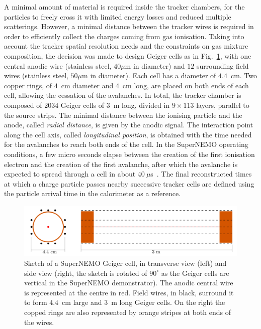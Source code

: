 A minimal amount of material is required inside the tracker chambers, for the particles to freely cross it with limited energy losses and reduced multiple scatterings.
However, a minimal distance between the tracker wires is required in order to efficiently collect the charges coming from gas ionisation.
Taking into account the tracker spatial resolution needs and the constraints on gas mixture composition, the decision was made to design Geiger cells as in Fig.~\ref{fig:SN_geiger_cell}, with one central anodic wire (stainless steel, $40\mu$m in diameter) and $12$ surrounding field wires (stainless steel, $50\mu$m in diameter).
Each cell has a diameter of $4.4$~cm.
Two copper rings, of $4$~cm diameter and $4$~cm long, are placed on both ends of each cell, allowing the cessation of the avalanches.
In total, the tracker chamber is composed of $2034$ Geiger cells of $3$~m long, divided in $9\times113$ layers, parallel to the source strips.
The minimal distance between the ionising particle and the anode, called \emph{radial distance}, is given by the anodic signal.
The interaction point along the cell axis, called \emph{longitudinal position}, is obtained with the time needed for the avalanches to reach both ends of the cell.
In the SuperNEMO operating conditions, a few micro seconds elapse between the creation of the first ionisation electron and the creation of the first avalanche, after which the avalanche is expected to spread through a cell in about $40~\mu$s~\cite{docdb:ashwin2015}.
The final reconstructed times at which a charge particle passes nearby successive tracker cells are defined using the particle arrival time in the calorimeter as a reference.
\begin{figure}[h!]
\centering
\includegraphics[width=1\textwidth]{SNdemonstrator/fig_SNdemonstrator/geiger_cell.pdf}
\caption{Sketch of a SuperNEMO Geiger cell, in transverse view (left) and side view (right, the sketch is rotated of $90^{\circ}$ as the Geiger cells are vertical in the SuperNEMO demonstrator).
  The anodic central wire is represented at the centre in red.
  Field wires, in black, surround it to form $4.4$~cm large and $3$~m long Geiger cells.
  On the right the copped rings are also represented by orange stripes at both ends of the wires.
\label{fig:SN_geiger_cell}}
\end{figure}

